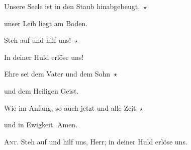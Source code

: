  \noindent Unsere Seele ist in den Staub hinabgebeugt,~$\star$~\nopagebreak

unser Leib liegt am Boden.

\noindent Steh auf und hilf uns!~$\star$~\nopagebreak

In deiner Huld erlöse uns!

\noindent Ehre sei dem Vater und dem Sohn~$\star$~\nopagebreak

und dem Heiligen Geist.

\noindent Wie im Anfang, so auch jetzt und alle Zeit~$\star$~\nopagebreak

und in Ewigkeit. Amen.

\vspace{10pt}

\noindent \textsc{Ant.} Steh auf und hilf uns, Herr; in deiner Huld erlöse uns.
